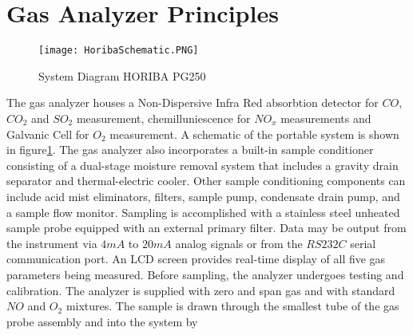\section{Gas Analyzer Principles}
\begin{figure}[h!]
    \centering
        \texttt{[image: HoribaSchematic.PNG]}
        \caption{System Diagram HORIBA PG250}
    \label{f:HoribaSchematic}
\end{figure}
The gas analyzer houses a Non-Dispersive Infra Red absorbtion detector for $CO$, $CO_2$ and $SO_2$ measurement, chemilluniescence for $NO_x$ measurements and Galvanic Cell for $O_2$ measurement. A schematic of the portable system is shown in figure\ref{f:HoribaSchematic}. The gas analyzer also incorporates a built-in sample conditioner consisting of a dual-stage moisture removal system that includes a gravity drain separator and thermal-electric cooler. Other sample conditioning components can include acid mist eliminators, filters, sample pump, condensate drain pump, and a sample flow monitor. Sampling is accomplished with a stainless steel unheated sample probe equipped with an external primary filter.
Data may be output from the instrument via $4mA$ to $20mA$ analog signals or from the $RS232C$ serial communication port. An LCD screen provides real-time display of all five gas parameters being measured. Before sampling, the analyzer undergoes testing and calibration. The analyzer is supplied with zero and span gas and with standard $NO$ and $O_2$ mixtures. The sample is drawn through the smallest tube of the gas probe assembly and into the system by
